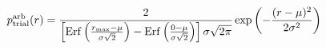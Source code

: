 \documentclass[12pt]{article}
\begin{document}
\begin{displaymath}
p_{\rm trial}^{\rm arb}(r) = 
{
{2}
\over
{
\left[
{\rm Erf}\left({{r_{\rm max}-\mu}\over{\sigma \sqrt{2}}}\right)
- {\rm Erf}\left({{0-\mu}\over{\sigma \sqrt{2}}}\right)
\right]
\sigma \sqrt{2 \pi}
}
}
\exp\left(-{{(r - \mu)^2}\over{2 \sigma^2}}\right)
\end{displaymath}
\end{document}
